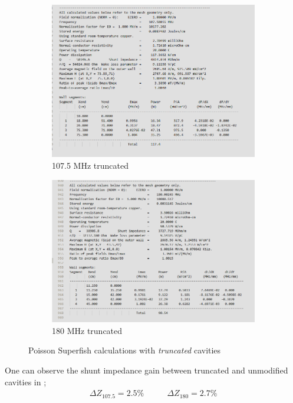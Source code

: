 \documentclass[a4paper,oneside,12pt]{report}
\numberwithin{equation}{chapter}
\begin{document}
\begin{figure}[H]
    \centering
    \begin{subfigure}{.5\textwidth}
      \centering
      \includegraphics[width=0.95\linewidth]{./figures/superfish/superfish107mod_z.png}
      \caption{107.5 MHz truncated}
    \end{subfigure}%
    \begin{subfigure}{.5\textwidth}
      \centering
      \includegraphics[width=\linewidth]{./figures/superfish/superfish180mod_z.png}
      \caption{180 MHz truncated}
    \end{subfigure}
    \caption{Poisson Superfish calculations with \textit{truncated} cavities}
    \label{fig:180_cavity_shunt_diff}
\end{figure}
One can observe the shunt impedance gain between truncated and unmodified cavities in ;
\begin{equation*}
    \begin{aligned}
        \Delta Z_{107.5}=2.5\%
    \end{aligned}
    \qquad
    \begin{aligned}
        \Delta Z_{180}=2.7\%
    \end{aligned}
\end{equation*}
\end{document}
